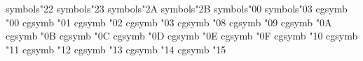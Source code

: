 


\DeclareMathSymbol{\cgup}        {\mathord}  {symbols}{"22}
\DeclareMathSymbol{\cgdown}      {\mathord}  {symbols}{"23}
\DeclareMathSymbol{\cgdoubleup}  {\mathord}  {symbols}{"2A}
\DeclareMathSymbol{\cgdoubledown}{\mathord}  {symbols}{"2B}
\DeclareMathSymbol{\cgneg}       {\mathord}  {symbols}{"00}
\DeclareMathSymbol{\cgstar}      {\mathord}  {symbols}{"03}
\DeclareMathSymbol{\cgtripleup}  {\mathord}  {cgsymb} {"00}
\DeclareMathSymbol{\cgtripledown}{\mathord}  {cgsymb} {"01}
\DeclareMathSymbol{\cgquadup}    {\mathord}  {cgsymb} {"02}
\DeclareMathSymbol{\cgquaddown}  {\mathord}  {cgsymb} {"03}
\DeclareMathSymbol{\cgtiny}      {\mathord}  {cgsymb} {"08}
\DeclareMathSymbol{\cgminy}      {\mathord}  {cgsymb} {"09}
\DeclareMathSymbol{\cgnmultiply} {\mathrel}  {cgsymb} {"0A}
\DeclareMathSymbol{\cgfuzzy}     {\mathrel}  {cgsymb} {"0B}
\DeclareMathSymbol{\cglfuz}      {\mathrel}  {cgsymb} {"0C}
\DeclareMathSymbol{\cggfuz}      {\mathrel}  {cgsymb} {"0D}
\DeclareMathSymbol{\cgupsum}     {\mathrel}  {cgsymb} {"0E}
\DeclareMathSymbol{\cgdownsum}   {\mathrel}  {cgsymb} {"0F}
\DeclareMathSymbol{\cgko}        {\mathord}  {cgsymb} {"10}
\DeclareMathSymbol{\cgKo}        {\mathord}  {cgsymb} {"11}
\DeclareMathSymbol{\cgbarforko}  {\mathord}  {cgsymb} {"12}
\DeclareMathSymbol{\cgfarstar}   {\mathord}  {cgsymb} {"13}
\DeclareMathSymbol{\cgloony}     {\mathord}  {cgsymb} {"14}
\DeclareMathSymbol{\cgsunny}     {\mathord}  {cgsymb} {"15}

\newcommand{\cgkobar}{\cgbarforko\cgko}
\newcommand{\cgKobar}{\cgbarforko\cgKo}

\newcommand\cgups[1]{%
  \ifcase#1\relax%
    0\or\cgup\or\cgdoubleup\or\cgtripleup\or\cgquadup%
  \else%
    \ifnum#1<\z@\cg@updownerror\else{#1}\cdot\cgup\fi%
  \fi%
}
\newcommand\cgdowns[1]{%
  \ifcase#1\relax%
    0\or\cgdown\or\cgdoubledown\or\cgtripledown\or\cgquaddown%
  \else%
    \ifnum#1<\z@\cg@updownerror\else{#1}\cdot\cgup\fi%
  \fi%
}
\newcommand\cg@updownerror{\errmessage{Argument to cgups and cgdowns must be positive.}}

